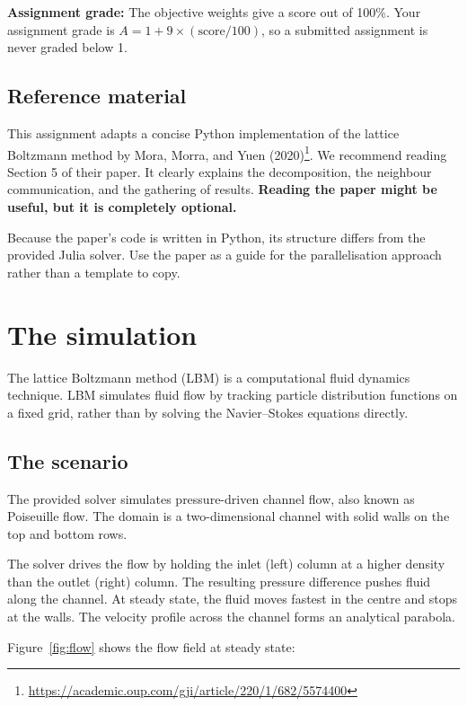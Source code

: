 \documentclass[11pt]{article}
\begin{document}
\textbf{Assignment grade:} The objective weights give a score out of 100\%. Your
assignment grade is $A = 1 + 9 \times (\text{score}/100)$, so a submitted assignment
is never graded below 1.




\subsection*{Reference material}

This assignment adapts a concise Python implementation of the lattice Boltzmann method by Mora,
Morra, and Yuen (2020)\footnote{\url{https://academic.oup.com/gji/article/220/1/682/5574400}}. We
recommend reading Section 5 of their paper. It clearly explains the decomposition, the neighbour
communication, and the gathering of results. \textbf{Reading the paper might be useful, but it is completely optional.} 

Because the paper's code is written in Python, its structure differs from the provided Julia
solver. Use the paper as a guide for the parallelisation approach rather than a template to copy.

\section{The simulation}

The lattice Boltzmann method (LBM) is a computational fluid dynamics technique. LBM simulates fluid
flow by tracking particle distribution functions on a fixed grid, rather than by solving the
Navier--Stokes equations directly.

\subsection*{The scenario}

The provided solver simulates pressure-driven channel flow, also known as Poiseuille flow. The
domain is a two-dimensional channel with solid walls on the top and bottom rows.

The solver drives the flow by holding the inlet (left) column at a higher density than the outlet
(right) column. The resulting pressure difference pushes fluid along the channel. At steady state,
the fluid moves fastest in the centre and stops at the walls. The velocity profile across the
channel forms an analytical parabola.

Figure~\ref{fig:flow} shows the flow field at steady state:
\end{document}
